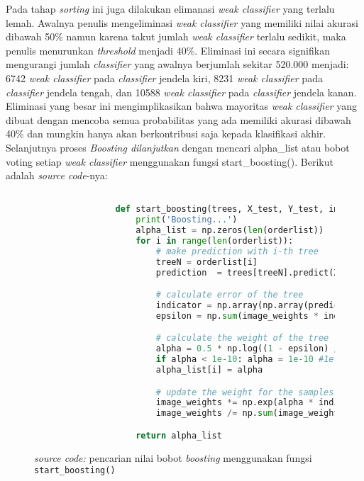 		Pada tahap \textit{sorting} ini juga dilakukan elimanasi \emph{weak classifier} yang terlalu lemah. 
		Awalnya penulis mengeliminasi \emph{weak classifier} yang memiliki nilai akurasi dibawah 50\% 
		namun karena takut jumlah \emph{weak classifier} terlalu sedikit, maka penulis menurunkan \textit{threshold} 
		menjadi 40\%. Eliminasi ini secara signifikan mengurangi jumlah \emph{classifier} yang awalnya berjumlah 
		sekitar 520.000 menjadi: 6742 \emph{weak classifier} pada \emph{classifier} jendela kiri, 
		8231 \emph{weak classifier} pada \emph{classifier} jendela tengah, dan 
		10588 \emph{weak classifier} pada \emph{classifier} jendela kanan. Eliminasi yang besar ini 
		mengimplikasikan bahwa mayoritas \emph{weak classifier} yang dibuat dengan mencoba 
		semua probabilitas yang ada memiliki akurasi dibawah 40\% dan mungkin hanya akan berkontribusi 
		saja kepada klasifikasi akhir. Selanjutnya proses \emph{Boosting dilanjutkan} dengan 
		mencari alpha\_list atau bobot voting setiap \emph{weak classifier} menggunakan fungsi 
		start\_boosting(). Berikut adalah \textit{source code}-nya:


		\begin{figure}[H]
			\begin{lstlisting}[language=Python, basicstyle=\tiny]

				def start_boosting(trees, X_test, Y_test, image_weights, orderlist):
					print('Boosting...')
					alpha_list = np.zeros(len(orderlist))
					for i in range(len(orderlist)):
						# make prediction with i-th tree
						treeN = orderlist[i]
						prediction  = trees[treeN].predict(X_test)

						# calculate error of the tree
						indicator = np.array(np.array(prediction).astype(int) != Y_test.flatten(), dtype = float)
						epsilon = np.sum(image_weights * indicator) / np.sum(image_weights)

						# calculate the weight of the tree
						alpha = 0.5 * np.log((1 - epsilon) / (epsilon + 1e-10)) + np.log(4 - 1) #1e-10 const added to prevent div by 0. 4 is number of class
						if alpha < 1e-10: alpha = 1e-10 #1e-10 const added to prevent alpha getting too small in np.exp(alpha * indicator) later
						alpha_list[i] = alpha

						# update the weight for the samples so the sum of image_weight will be close to 1 for the next iteration
						image_weights *= np.exp(alpha * indicator)
						image_weights /= np.sum(image_weights)

					return alpha_list

			\end{lstlisting}
			\caption{\emph{source code:} pencarian nilai bobot \emph{boosting} menggunakan fungsi 
			\texttt{start\_boosting()}}
			\label{code: start boosting}
		\end{figure}

